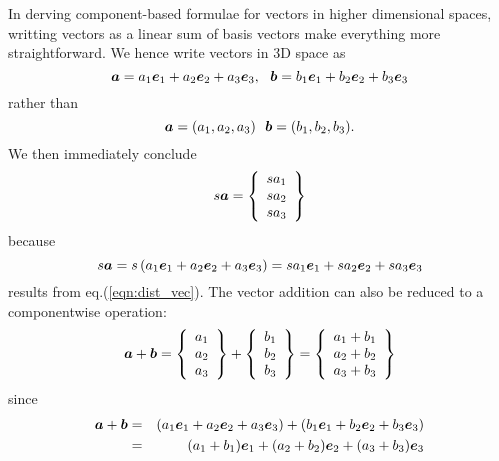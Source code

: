 \documentclass[10pt,a4j]{article}
\begin{document}
In derving component-based formulae for vectors in higher dimensional spaces, 
writting vectors as a linear sum of basis vectors make everything more straightforward. 
We hence write vectors in 3D space as 
\begin{equation}
	\fat{a}= a_1\fat{e}_1+ a_2\fat{e}_2+ a_3\fat{e}_3, \ \ 
	\fat{b}= b_1\fat{e}_1+ b_2\fat{e}_2+ b_3\fat{e}_3
	\label{eqn:}
\end{equation}
rather than 
\begin{equation}
	\fat{a}= (a_1,  a_2, a_3) \ \ 
	\fat{b}= (b_1,  b_2, b_3).
\end{equation}
We then immediately conclude 
\begin{equation}
	s\mbox{\boldmath $a$}
	=
	\left\{
		\begin{array}{c}
			sa_1 \\
			sa_2 \\
			sa_3 
		\end{array}
	\right\}
	\label{eqn:}
\end{equation}
because 
\begin{equation}
	s\mbox{\boldmath $a$}= s \left(a_1\mbox{\boldmath $e$}_1+ a_2\mbox{\boldmath $e$}_2+ a_3\mbox{\boldmath $e$}_3\right)
	=sa_1\mbox{\boldmath $e$}_1+ sa_2\mbox{\boldmath $e$}_2+ sa_3\mbox{\boldmath $e$}_3
	\label{eqn:}
\end{equation}
results from eq.(\ref{eqn:dist_vec}).
The vector addition can also be reduced to a componentwise operation:
\begin{equation}
	\mbox{\boldmath $a$}
	+
	\mbox{\boldmath $b$}
	=
	\left\{
		\begin{array}{c}
			a_1 \\
			a_2 \\
			a_3 
		\end{array}
	\right\}
	+
	\left\{
		\begin{array}{c}
			b_1 \\
			b_2 \\
			b_3 
		\end{array}
	\right\}
	=
	\left\{
		\begin{array}{c}
			a_1+b_1 \\
			a_2+b_2 \\
			a_3+b_3
		\end{array}
	\right\}
	\label{eqn:}
\end{equation}
since 
\begin{eqnarray}
	\mbox{\boldmath $a$}+\mbox{\boldmath $b$}
	&=&
	\left(a_1\mbox{\boldmath $e$}_1+ a_2\mbox{\boldmath $e$}_2+ a_3\mbox{\boldmath $e$}_3 \right)+
	\left(b_1\mbox{\boldmath $e$}_1+ b_2\mbox{\boldmath $e$}_2+ b_3\mbox{\boldmath $e$}_3 \right) \\
	&=&
	(a_1+b_1)\mbox{\boldmath $e$}_1
	+
	(a_2+b_2)\mbox{\boldmath $e$}_2
	+
	(a_3+b_3)\mbox{\boldmath $e$}_3
	\label{eqn:}
\end{eqnarray}
\end{document}
